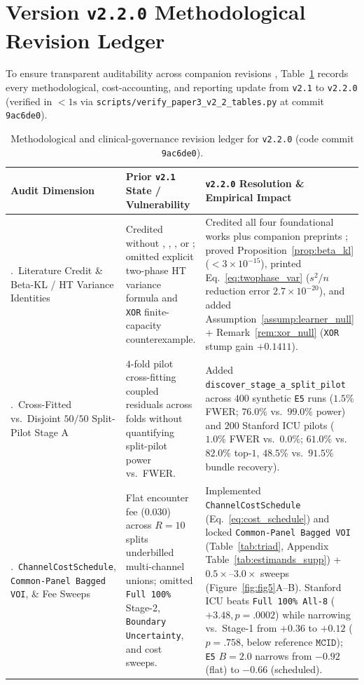 \documentclass[11pt]{article}
\theoremstyle{remark}
\begin{document}
\section{Version \texttt{v2.2.0} Methodological Revision Ledger}
\label{app:ledger}

To ensure transparent auditability across companion revisions \citep{satz2026pilot,satz2026collision}, Table~\ref{tab:rev_ledger} records every methodological, cost-accounting, and reporting update from \texttt{v2.1} to \texttt{v2.2.0} (verified in $<1\text{s}$ via \texttt{scripts/verify\_paper3\_v2\_2\_tables.py} at commit \texttt{9ac6de0}).

\begin{table}[h!]
\centering
\caption{Methodological and clinical-governance revision ledger for \texttt{v2.2.0} (code commit \texttt{9ac6de0}).}
\label{tab:rev_ledger}
\scriptsize
\renewcommand{\arraystretch}{1.12}
\begin{tabular}{>{\raggedright\arraybackslash}p{}>{\raggedright\arraybackslash}p{}>{\raggedright\arraybackslash}p{}}
\toprule
\textbf{Audit Dimension} & \textbf{Prior \texttt{v2.1} State / Vulnerability} & \textbf{\texttt{v2.2.0} Resolution \& Empirical Impact} \\
\midrule
1.\ Literature Credit \& Beta-KL / HT Variance Identities & Credited \citet{schervish1989general} without \citet{buja2005loss}, \citet{turney1995cost}, \citet{bilgic2011value}, or \citet{saerens2002adjusting}; omitted explicit two-phase HT variance formula and \texttt{XOR} finite-capacity counterexample. & Credited all four foundational works plus companion preprints \citep{satz2026pilot,satz2026collision}; proved Proposition~\ref{prop:beta_kl} ($<3\times 10^{-15}$), printed Eq.~\eqref{eq:twophase_var} ($s^2/n$ reduction error $2.7\times 10^{-20}$), and added Assumption~\ref{assump:learner_null} + Remark~\ref{rem:xor_null} (\texttt{XOR} stump gain $+0.1411$). \\
2.\ Cross-Fitted vs.\ Disjoint $50/50$ Split-Pilot Stage A & $4$-fold pilot cross-fitting coupled residuals across folds without quantifying split-pilot power vs.\ FWER. & Added \texttt{discover\_stage\_a\_split\_pilot} across $400$ synthetic \texttt{E5} runs ($1.5\%$ FWER; $76.0\%$ vs.\ $99.0\%$ power) and $200$ Stanford ICU pilots ($1.0\%$ FWER vs.\ $0.0\%$; $61.0\%$ vs.\ $82.0\%$ top-$1$, $48.5\%$ vs.\ $91.5\%$ bundle recovery). \\
3.\ \texttt{ChannelCostSchedule}, \texttt{Common-Panel Bagged VOI}, \& Fee Sweeps & Flat encounter fee ($0.030$) across $R=10$ splits underbilled multi-channel unions; omitted \texttt{Full 100\%} Stage-2, \texttt{Boundary Uncertainty}, and cost sweeps. & Implemented \texttt{ChannelCostSchedule} (Eq.~\eqref{eq:cost_schedule}) and locked \texttt{Common-Panel Bagged VOI} (Table~\ref{tab:triad}, Appendix Table~\ref{tab:estimands_supp}) + $0.5\times\text{--}3.0\times$ sweeps (Figure~\ref{fig:fig5}A--B). Stanford ICU beats \texttt{Full 100\% All-8} ($+3.48, p=.0002$) while narrowing vs.\ Stage-1 from $+0.36$ to $+0.12$ ($p=.758$, below reference $\texttt{MCID}$); \texttt{E5} $B=2.0$ narrows from $-0.92$ (flat) to $-0.66$ (scheduled). \\

\end{tabular}
\end{table}
\end{document}
